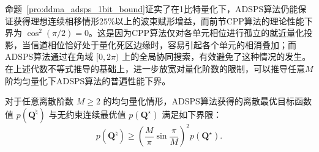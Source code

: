 命题~\ref{pro:ddma_adsps_1bit_bound}证实了在1比特量化下，ADSPS算法仍能保证获得理想连续相移情形$25\%$以上的波束赋形增益，而前节CPP算法的理论性能下界为 $\cos^2(\pi/2) = 0$。这是因为CPP算法仅对各单元相位进行孤立的就近量化投影，当信道相位恰好处于量化死区边缘时，容易引起各个单元的相消叠加；而ADSPS算法通过在角域 $[0, 2\pi)$ 上的全局协同搜索，有效避免了这种情况的发生。
在上述代数不等式推导的基础上，进一步放宽对量化阶数的限制，可以推导任意$M$阶均匀量化下ADSPS算法的普遍性能下界。

\begin{proposition}\label{pro:ddma_adsps_Mbit_bound}
	对于任意离散阶数 $M \ge 2$ 的均匀量化情形，ADSPS算法获得的离散最优目标函数值 $p(\bm Q^{\natural})$ 与无约束连续最优值 $p(\bm Q^{\star})$ 满足如下界限：
	\begin{equation}\label{eq:ddma_adsps_Mbit_bound}
		p(\bm Q^{\natural}) \ge \left( \frac{M}{\pi} \sin \frac{\pi}{M} \right)^2 p(\bm Q^{\star}).
	\end{equation}
\end{proposition}

